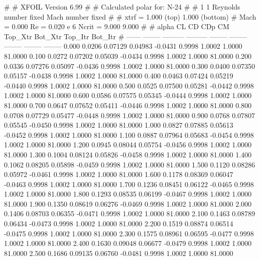 #  
#       XFOIL         Version 6.99
#  
# Calculated polar for: N-24                                            
#  
# 1 1 Reynolds number fixed          Mach number fixed         
#  
# xtrf =   1.000 (top)        1.000 (bottom)  
# Mach =   0.000     Re =     0.020 e 6     Ncrit =   9.000  9.000
#  
#   alpha    CL        CD       CDp       CM     Top_Xtr  Bot_Xtr  Top_Itr  Bot_Itr
#  ------ -------- --------- --------- -------- -------- -------- -------- --------
   0.000   0.0206   0.07129   0.04983  -0.0431   0.9998   1.0002   1.0000  81.0000
   0.100   0.0272   0.07202   0.05039  -0.0434   0.9998   1.0002   1.0000  81.0000
   0.200   0.0336   0.07276   0.05097  -0.0436   0.9998   1.0002   1.0000  81.0000
   0.300   0.0400   0.07350   0.05157  -0.0438   0.9998   1.0002   1.0000  81.0000
   0.400   0.0463   0.07424   0.05219  -0.0440   0.9998   1.0002   1.0000  81.0000
   0.500   0.0525   0.07500   0.05281  -0.0442   0.9998   1.0002   1.0000  81.0000
   0.600   0.0586   0.07575   0.05345  -0.0444   0.9998   1.0002   1.0000  81.0000
   0.700   0.0647   0.07652   0.05411  -0.0446   0.9998   1.0002   1.0000  81.0000
   0.800   0.0708   0.07729   0.05477  -0.0448   0.9998   1.0002   1.0000  81.0000
   0.900   0.0768   0.07807   0.05545  -0.0450   0.9998   1.0002   1.0000  81.0000
   1.000   0.0827   0.07885   0.05613  -0.0452   0.9998   1.0002   1.0000  81.0000
   1.100   0.0887   0.07964   0.05683  -0.0454   0.9998   1.0002   1.0000  81.0000
   1.200   0.0945   0.08044   0.05754  -0.0456   0.9998   1.0002   1.0000  81.0000
   1.300   0.1004   0.08124   0.05826  -0.0458   0.9998   1.0002   1.0000  81.0000
   1.400   0.1062   0.08205   0.05898  -0.0459   0.9998   1.0002   1.0000  81.0000
   1.500   0.1120   0.08286   0.05972  -0.0461   0.9998   1.0002   1.0000  81.0000
   1.600   0.1178   0.08369   0.06047  -0.0463   0.9998   1.0002   1.0000  81.0000
   1.700   0.1236   0.08451   0.06122  -0.0465   0.9998   1.0002   1.0000  81.0000
   1.800   0.1293   0.08535   0.06199  -0.0467   0.9998   1.0002   1.0000  81.0000
   1.900   0.1350   0.08619   0.06276  -0.0469   0.9998   1.0002   1.0000  81.0000
   2.000   0.1406   0.08703   0.06355  -0.0471   0.9998   1.0002   1.0000  81.0000
   2.100   0.1463   0.08789   0.06434  -0.0473   0.9998   1.0002   1.0000  81.0000
   2.200   0.1519   0.08874   0.06514  -0.0475   0.9998   1.0002   1.0000  81.0000
   2.300   0.1575   0.08961   0.06595  -0.0477   0.9998   1.0002   1.0000  81.0000
   2.400   0.1630   0.09048   0.06677  -0.0479   0.9998   1.0002   1.0000  81.0000
   2.500   0.1686   0.09135   0.06760  -0.0481   0.9998   1.0002   1.0000  81.0000
